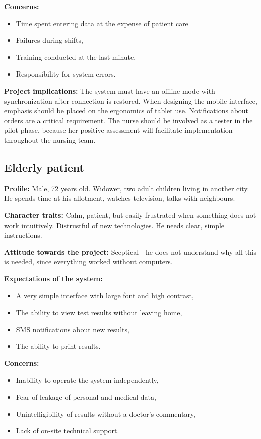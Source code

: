 \textbf{Concerns:}
\begin{itemize}
    \item Time spent entering data at the expense of patient care
    \item Failures during shifts,
    \item Training conducted at the last minute,
    \item Responsibility for system errors.
\end{itemize}
\textbf{Project implications:} The system must have an offline mode with synchronization after connection is restored. When designing the mobile interface, emphasis should be placed on the ergonomics of tablet use. Notifications about orders are a critical requirement. The nurse should be involved as a tester in the pilot phase, because her positive assessment will facilitate implementation throughout the nursing team.

\subsection{Elderly patient}

\textbf{Profile:} Male, 72 years old. Widower, two adult children living in another city. He spends time at his allotment, watches television, talks with neighbours.

\textbf{Character traits:} Calm, patient, but easily frustrated when something does not work intuitively. Distrustful of new technologies. He needs clear, simple instructions.

\textbf{Attitude towards the project:} Sceptical - he does not understand why all this is needed, since everything worked without computers.

\textbf{Expectations of the system:}
\begin{itemize}
    \item A very simple interface with large font and high contrast,
    \item The ability to view test results without leaving home,
    \item SMS notifications about new results,
    \item The ability to print results.
\end{itemize}

\textbf{Concerns:}
\begin{itemize}
    \item Inability to operate the system independently,
    \item Fear of leakage of personal and medical data,
    \item Unintelligibility of results without a doctor's commentary,
    \item Lack of on-site technical support.
\end{itemize}

